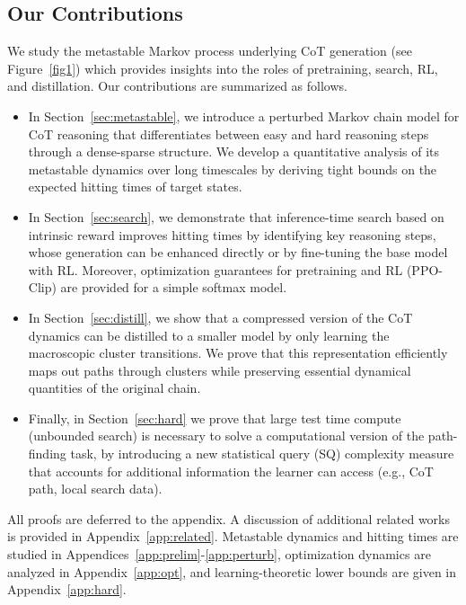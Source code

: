 \subsection{Our Contributions}

We study the metastable Markov process underlying CoT generation (see Figure~\ref{fig1}) which provides insights into the roles of pretraining, search, RL, and distillation. Our contributions are summarized as follows. 

\begin{itemize}
\item In Section~\ref{sec:metastable}, we introduce a perturbed Markov chain model for CoT reasoning that differentiates between easy and hard reasoning steps through a dense-sparse structure. We develop a quantitative analysis of its metastable dynamics over long timescales by deriving tight bounds on the expected hitting times of target states. 
\item In Section~\ref{sec:search}, we demonstrate that inference-time search based on intrinsic reward improves hitting times by identifying key reasoning steps, whose generation can be enhanced directly or by fine-tuning the base model with RL. Moreover, optimization guarantees for pretraining and RL (PPO-Clip) are provided for a simple softmax model.
\item In Section~\ref{sec:distill}, we show that a compressed version of the CoT dynamics can be distilled to a smaller model by only learning the macroscopic cluster transitions. We prove that this representation efficiently maps out paths through clusters while preserving essential dynamical quantities of the original chain.
\item Finally, in Section~\ref{sec:hard} we prove that large test time compute (unbounded search) is necessary to solve a computational version of the path-finding task, by introducing a new statistical query (SQ) complexity measure that accounts for additional information the learner can access (e.g., CoT path, local search data).
\end{itemize}

All proofs are deferred to the appendix. A discussion of additional related works is provided in Appendix~\ref{app:related}. Metastable dynamics and hitting times are studied in Appendices~\ref{app:prelim}-\ref{app:perturb}, optimization dynamics are analyzed in Appendix~\ref{app:opt}, and learning-theoretic lower bounds are given in Appendix~\ref{app:hard}.
